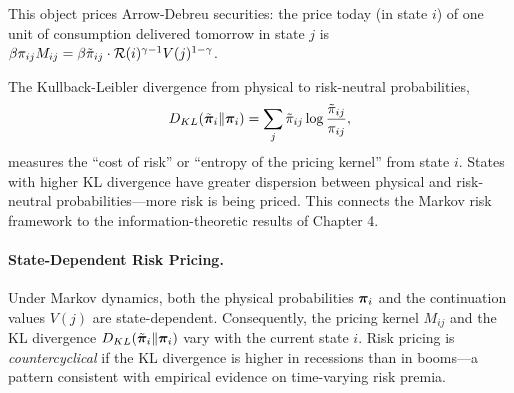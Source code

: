 This object prices Arrow-Debreu securities: the price today (in state $i$) of one unit of consumption delivered tomorrow in state $j$ is $\beta \pi_{ij} M_{ij} = \beta \tilde{\pi}_{ij} \cdot \mathcal{R}(i)^{\gamma-1} V(j)^{1-\gamma}$.

\begin{calloutimportant}
The Kullback-Leibler divergence from physical to risk-neutral probabilities,
\begin{equation}
D_{KL}(\tilde{\bm{\pi}}_i \| \bm{\pi}_i) = \sum_j \tilde{\pi}_{ij} \log \frac{\tilde{\pi}_{ij}}{\pi_{ij}},
\label{eq:kl-risk}
\end{equation}
measures the ``cost of risk'' or ``entropy of the pricing kernel'' from state $i$. States with higher KL divergence have greater dispersion between physical and risk-neutral probabilities---more risk is being priced. This connects the Markov risk framework to the information-theoretic results of Chapter 4.
\end{calloutimportant}

\paragraph{State-Dependent Risk Pricing.}
Under Markov dynamics, both the physical probabilities $\bm{\pi}_i$ and the continuation values $V(j)$ are state-dependent. Consequently, the pricing kernel $M_{ij}$ and the KL divergence $D_{KL}(\tilde{\bm{\pi}}_i \| \bm{\pi}_i)$ vary with the current state $i$. Risk pricing is \emph{countercyclical} if the KL divergence is higher in recessions than in booms---a pattern consistent with empirical evidence on time-varying risk premia.

